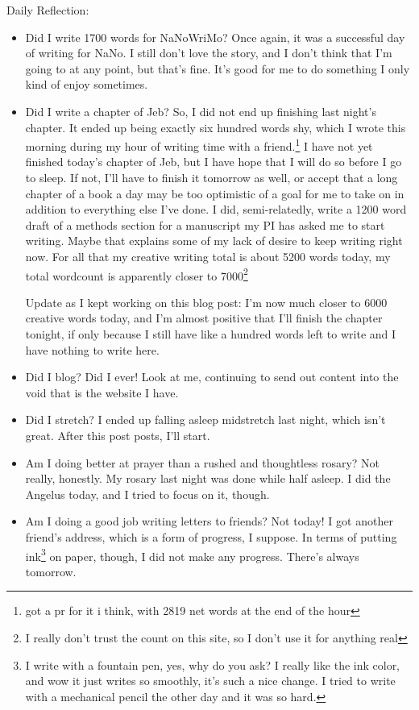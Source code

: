 \documentclass[12pt]{article}[titlepage]
\renewcommand{\,}{\textsuperscript{,}}
\begin{document}
Daily Reflection:
\begin{itemize}
\item Did I write 1700 words for NaNoWriMo? Once again, it was a successful day of writing for NaNo.
I still don't love the story, and I don't think that I'm going to at any point, but that's fine.
It's good for me to do something I only kind of enjoy sometimes.
\item Did I write a chapter of Jeb? 
So, I did not end up finishing last night's chapter. It ended up being exactly six hundred words shy, which I wrote this morning during my hour of writing time with a friend.\footnote{got a pr for it i think, with 2819 net words at the end of the hour}
I have not yet finished today's chapter of Jeb, but I have hope that I will do so before I go to sleep.
If not, I'll have to finish it tomorrow as well, or accept that a long chapter of a book a day may be too optimistic of a goal for me to take on in addition to everything else I've done.
I did, semi-relatedly, write a 1200 word draft of a methods section for a manuscript my PI has asked me to start writing. 
Maybe that explains some of my lack of desire to keep writing right now.
For all that my creative writing total is about 5200 words today, my total wordcount is apparently closer to 7000\footnote{I really don't trust the count on this site, so I don't use it for anything real}

Update as I kept working on this blog post: I'm now much closer to 6000 creative words today, and I'm almost positive that I'll finish the chapter tonight, if only because I still have like a hundred words left to write and I have nothing to write here.

\item Did I blog? Did I ever! Look at me, continuing to send out content into the void that is the website I have.
\item Did I stretch? I ended up falling asleep midstretch last night, which isn't great.
After this post posts, I'll start.
\item Am I doing better at prayer than a rushed and thoughtless rosary? 
Not really, honestly.
My rosary last night was done while half asleep.
I did the Angelus today, and I tried to focus on it, though.
\item Am I doing a good job writing letters to friends?
Not today!
I got another friend's address, which is a form of progress, I suppose.
In terms of putting ink\footnote{I write with a fountain pen, yes, why do you ask?
I really like the ink color, and wow it just writes so smoothly, it's such a nice change.
I tried to write with a mechanical pencil the other day and it was so hard.}
on paper, though, I did not make any progress.
There's always tomorrow.
\end{itemize}
\end{document}
